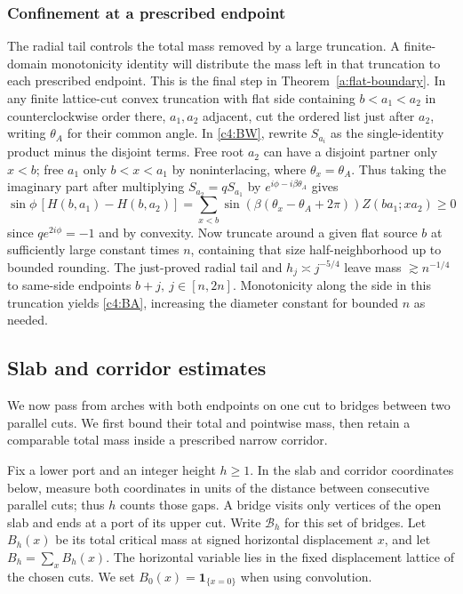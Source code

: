\subsubsection{Confinement at a prescribed endpoint}
The radial tail controls the total mass removed by a large truncation.
A finite-domain monotonicity identity will distribute the mass left in
that truncation to each prescribed endpoint. This is the final step in
Theorem~\ref{a:flat-boundary}. In any finite lattice-cut convex truncation with flat side containing \(b<a_1<a_2\) in counterclockwise order there, \(a_1,a_2\) adjacent, cut the ordered list just after \(a_2\), writing \(\theta_A\) for their common angle. In \eqref{c4:BW}, rewrite \(S_{a_i}\) as the single-identity product minus the disjoint terms. Free root \(a_2\) can have a disjoint partner only \(x<b\); free \(a_1\) only \(b<x<a_1\) by noninterlacing, where \(\theta_x=\theta_A\). Thus taking the imaginary part after multiplying \(S_{a_2}=q S_{a_1}\) by \(e^{i\phi-i\beta\theta_A}\) gives
\[
 \sin\phi\,[H(b,a_1)-H(b,a_2)]
     =\sum_{x<b}\sin(\beta(\theta_x-\theta_A+2\pi))Z(ba_1;xa_2)\ge0
\]
since \(q e^{2i\phi}=-1\) and by convexity. Now truncate around a given flat source \(b\) at sufficiently large constant times \(n\), containing that size half-neighborhood up to bounded rounding. The just-proved radial tail and \(h_j\asymp j^{-5/4}\) leave mass \(\gtrsim n^{-1/4}\) to same-side endpoints \(b+j,\ j\in[n,2n]\). Monotonicity along the side in this truncation yields \eqref{c4:BA}, increasing the diameter constant for bounded \(n\) as needed.

\subsection{Slab and corridor estimates}\label{c4:corridors}

We now pass from arches with both endpoints on one cut to bridges between
two parallel cuts. We first bound their total and pointwise mass, then
retain a comparable total mass inside a prescribed narrow corridor.

Fix a lower port and an integer height $h\ge1$. In the slab and corridor
coordinates below, measure both coordinates in units of the distance
between consecutive parallel cuts; thus $h$ counts those gaps.
A bridge visits only vertices of the open slab and ends at a port of its
upper cut. Write $\mathcal B_h$ for this set of bridges. Let $B_h(x)$ be
its total critical mass at signed horizontal
displacement $x$, and let $B_h=\sum_xB_h(x)$. The horizontal variable lies
in the fixed displacement lattice of the chosen cuts. We set
$B_0(x)=\mathbf1_{\{x=0\}}$ when using convolution.

